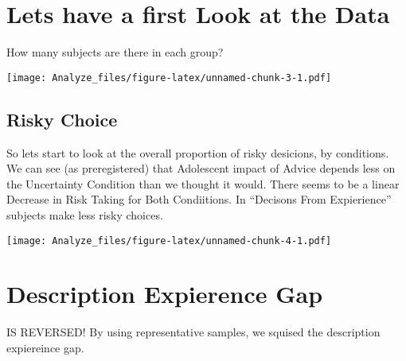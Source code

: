 \documentclass[]{article}
\newenvironment{Shaded}{\begin{snugshade}}{\end{snugshade}}
\newcommand{\KeywordTok}[1]{\textcolor[rgb]{0.13,0.29,0.53}{\textbf{#1}}}
\newcommand{\DataTypeTok}[1]{\textcolor[rgb]{0.13,0.29,0.53}{#1}}
\newcommand{\DecValTok}[1]{\textcolor[rgb]{0.00,0.00,0.81}{#1}}
\newcommand{\FloatTok}[1]{\textcolor[rgb]{0.00,0.00,0.81}{#1}}
\newcommand{\StringTok}[1]{\textcolor[rgb]{0.31,0.60,0.02}{#1}}
\newcommand{\OperatorTok}[1]{\textcolor[rgb]{0.81,0.36,0.00}{\textbf{#1}}}
\newcommand{\NormalTok}[1]{#1}
\begin{document}
\section{Lets have a first Look at the
Data}\label{lets-have-a-first-look-at-the-data}

How many subjects are there in each group?

\begin{Shaded}
\end{Shaded}

\texttt{[image: Analyze\_files/figure-latex/unnamed-chunk-3-1.pdf]}

\subsection{Risky Choice}\label{risky-choice}

So lets start to look at the overall proportion of risky desicions, by
conditions. We can see (as preregistered) that Adolescent impact of
Advice depends less on the Uncertainty Condition than we thought it
would. There seems to be a linear Decrease in Risk Taking for Both
Condiitions. In ``Decisons From Expierience'' subjects make less risky
choices.

\texttt{[image: Analyze\_files/figure-latex/unnamed-chunk-4-1.pdf]}

\section{Description Expierence Gap}\label{description-expierence-gap}

IS REVERSED! By using representative samples, we squised the description
expiereince gap.
\end{document}
